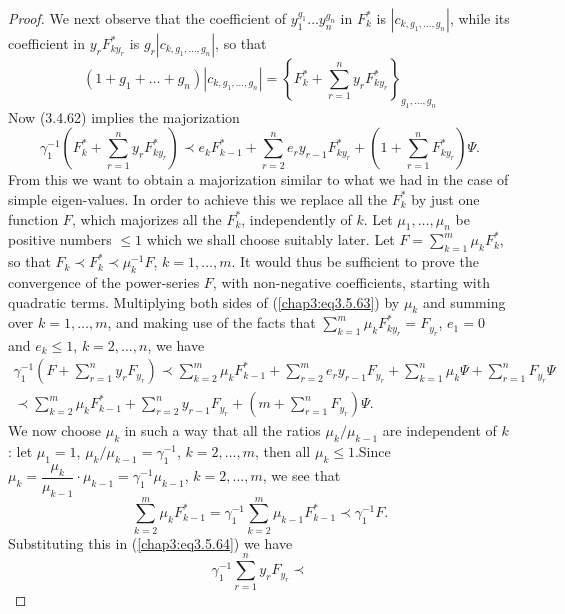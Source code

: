 \begin{proof}
We next observe that the coefficient of $y^{g_1}_1 \ldots y^{g_n}_n$
in $F^*_k$ is $|c_{k, g_1, \ldots, g_n}|$, while its coefficient in
$y_r F^*_{ky_r}$ is $g_r |c_{k, g_1, \ldots, g_n}|$, 
so that\pageoriginale
$$
(1+ g_1 + \ldots + g_n) |c_{k, g_1, \ldots, g_n}| = \left\{F^*_k +
\sum\limits^n_{r=1} y_r F^*_{ky_r} \right\}_{g_1, \ldots, g_n} 
$$
Now (3.4.62) implies the majorization
\begin{equation*}
\gamma^{-1}_1 \left(F^*_k +\sum\limits^n_{r=1} y_r F^*_{ky_r} \right)
\prec e_k F^*_{k-1} + \sum\limits^n_{r=2} e_r y_{r-1} F^*_{ky_r} +
\left(1+ \sum\limits^n_{r=1} F^*_{ky_r} \right)
\Psi. \tag{3.5.63}\label{chap3:eq3.5.63} 
\end{equation*}
From this we want to obtain a majorization similar to what we had in
the case of simple eigen-values. In order to achieve this we replace
all the $F^*_k$ by just one function $F$, which majorizes all the
$F^*_k$, independently of $k$. Let $\mu_1, \ldots, \mu_n$ be positive
numbers $\leq 1$ which we shall choose suitably later. Let  $F =
\sum\limits^m_{k=1} \mu_k F^*_k$, so that $F_k \prec F^*_k \prec
\mu^{-1}_k F$, $k=1, \ldots, m$. It would thus be sufficient to prove
the convergence of the power-series $F$, with non-negative
coefficients, starting with quadratic terms. Multiplying both sides of
(\ref{chap3:eq3.5.63}) by $\mu_k$ and summing over $k=1, \ldots,m$,
and making use of the facts that $\sum\limits^m_{k=1} \mu_k F^*_{ky_r}
= F_{y_r}$, $e_1 = 0$ and $e_k \leq 1$, $k=2,\ldots, n$, we have 
\begin{gather*}
\gamma^{-1}_1 (F + \sum\limits^n_{r=1} y_r F_{y_r}) \prec
\sum\limits^m_{k=2} \mu_k F^*_{k-1} + \sum\limits^m_{r=2} e_r y_{r-1}
F_{y_r} + \sum\limits^n_{k=1} \mu_k \Psi + \sum\limits^n_{r=1} F_{y_r}
\Psi\\ 
\prec \sum\limits^m_{k=2} \mu_k F^*_{k-1} + \sum\limits^n_{r=2}
y_{r-1} F_{y_r} + \left(m+ \sum\limits^n_{r=1} F_{y_r} \right) \Psi.  
\tag{3.5.64}\label{chap3:eq3.5.64}
\end{gather*}
We now choose $\mu_k$ in such a way that all the ratios $\mu_k /
\mu_{k-1}$ are independent of $k$: let $\mu_1=1$, $\mu_k/ \mu_{k-1} =
\gamma^{-1}_1$, $k=2, \ldots, m$, then all $\mu_k \leq
1$.\pageoriginale Since $\mu_k = \dfrac{\mu_k}{\mu_{k-1}} \cdot
\mu_{k-1} = \gamma^{-1}_1 \mu_{k-1}$, $k=2, \ldots, m$, we see that 
$$
\sum\limits^m_{k=2} \mu_k F^*_{k-1} = \gamma^{-1}_1
\sum\limits^{m}_{k=2} \mu_{k-1} F^*_{k-1} \prec \gamma^{-1}_1 F. 
$$
Substituting this in (\ref{chap3:eq3.5.64}) we have
$$
\gamma^{-1}_1 \sum\limits^n_{r=1} y_r F_{y_r} \prec
$$
\end{proof}
